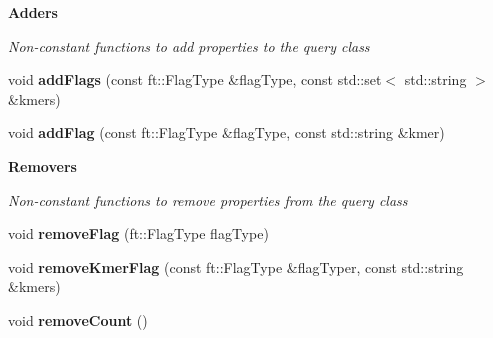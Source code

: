 \begin{Indent}\textbf{ Adders}\par
{\em Non-\/constant functions to add properties to the query class }\begin{DoxyCompactItemize}
\item 
\mbox{\label{classft_1_1QueryClass_ae9c88ff1d7b1b22746a8ada4397e5ff3}} 
void {\bfseries add\+Flags} (const ft\+::\+Flag\+Type \&flag\+Type, const std\+::set$<$ std\+::string $>$ \&kmers)
\item 
\mbox{\label{classft_1_1QueryClass_a7cbdbc868f70aa19d8294dc8a12105c3}} 
void {\bfseries add\+Flag} (const ft\+::\+Flag\+Type \&flag\+Type, const std\+::string \&kmer)
\end{DoxyCompactItemize}
\end{Indent}
\begin{Indent}\textbf{ Removers}\par
{\em Non-\/constant functions to remove properties from the query class }\begin{DoxyCompactItemize}
\item 
\mbox{\label{classft_1_1QueryClass_aeed393478364d0a9418e0b1865edf496}} 
void {\bfseries remove\+Flag} (ft\+::\+Flag\+Type flag\+Type)
\item 
\mbox{\label{classft_1_1QueryClass_afbc6473d32447770ab7b904a2f92d5a0}} 
void {\bfseries remove\+Kmer\+Flag} (const ft\+::\+Flag\+Type \&flag\+Typer, const std\+::string \&kmers)
\item 
\mbox{\label{classft_1_1QueryClass_a91b12e43c13037fd0eb53bb2cee0668f}} 
void {\bfseries remove\+Count} ()
\end{DoxyCompactItemize}
\end{Indent}
